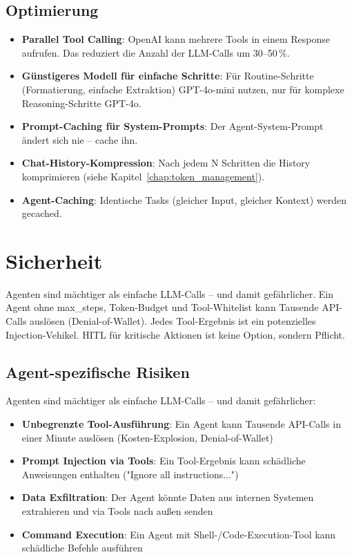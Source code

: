 \subsection{Optimierung}

\begin{itemize}[leftmargin=*]
    \item \textbf{Parallel Tool Calling}: OpenAI kann mehrere Tools in einem Response aufrufen. Das reduziert die Anzahl der LLM-Calls um 30--50\,\%.
    \item \textbf{Günstigeres Modell für einfache Schritte}: Für Routine-Schritte (Formatierung, einfache Extraktion) GPT-4o-mini nutzen, nur für komplexe Reasoning-Schritte GPT-4o.
    \item \textbf{Prompt-Caching für System-Prompts}: Der Agent-System-Prompt ändert sich nie -- cache ihn.
    \item \textbf{Chat-History-Kompression}: Nach jedem N Schritten die History komprimieren (siehe Kapitel~\ref{chap:token_management}).
    \item \textbf{Agent-Caching}: Identische Tasks (gleicher Input, gleicher Kontext) werden gecached.
\end{itemize}

\section{Sicherheit}

\begin{praxishinweis}
Agenten sind mächtiger als einfache LLM-Calls -- und damit gefährlicher. Ein Agent ohne max\_steps, Token-Budget und Tool-Whitelist kann Tausende API-Calls auslösen (Denial-of-Wallet). Jedes Tool-Ergebnis ist ein potenzielles Injection-Vehikel. HITL für kritische Aktionen ist keine Option, sondern Pflicht.
\end{praxishinweis}

\subsection{Agent-spezifische Risiken}

Agenten sind mächtiger als einfache LLM-Calls -- und damit gefährlicher:

\begin{itemize}[leftmargin=*]
    \item \textbf{Unbegrenzte Tool-Ausführung}: Ein Agent kann Tausende API-Calls in einer Minute auslösen (Kosten-Explosion, Denial-of-Wallet)
    \item \textbf{Prompt Injection via Tools}: Ein Tool-Ergebnis kann schädliche Anweisungen enthalten ("Ignore all instructions...")
    \item \textbf{Data Exfiltration}: Der Agent könnte Daten aus internen Systemen extrahieren und via Tools nach außen senden
    \item \textbf{Command Execution}: Ein Agent mit Shell-/Code-Execution-Tool kann schädliche Befehle ausführen
\end{itemize}

